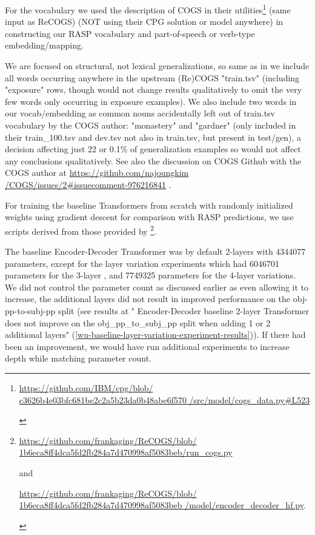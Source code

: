 \documentclass[11pt]{article}
\begin{document}
For the vocabulary we used the \citep{klinger2024compositionalprogramgenerationfewshot} description of COGS in their utilities\footnote{\begin{footnotesize}\href{https://github.com/IBM/cpg/blob/c3626b4e03bfc681be2c2a5b23da0b48abe6f570/src/model/cogs\_data.py\#L523}{https://github.com/IBM/cpg/blob/
c3626b4e03bfc681be2c2a5b23da0b48abe6f570
/src/model/cogs\_data.py\#L523}
\end{footnotesize}
} (same input as ReCOGS) (NOT using their CPG solution or model anywhere) in constructing our RASP vocabulary and part-of-speech or verb-type embedding/mapping. 

We are focused on structural, not lexical generalizations, so same as in \citep{klinger2024compositionalprogramgenerationfewshot} we include all words occurring anywhere in the upstream (Re)COGS "train.tsv" (including "exposure" rows, though would not change results qualitatively to omit the very few words only occurring in exposure examples). We also include two words in our vocab/embedding as common nouns accidentally left out of train.tsv vocabulary by the COGS author: "monastery" and "gardner" (only included in their train\_100.tsv and dev.tsv not also in train.tsv, but present in test/gen), a decision affecting just 22 or 0.1\% of generalization examples so would not affect any conclusions qualitatively. See also the discussion on COGS Github with the COGS author at 
\href{https://github.com/najoungkim/COGS/issues/2\#issuecomment-976216841}{https://github.com/najoungkim
/COGS/issues/2\#issuecomment-976216841} .

For training the baseline Transformers from scratch with randomly initialized weights using gradient descent for comparison with RASP predictions, we use scripts derived from those provided by \citep{Wu2023}\footnote{\begin{footnotesize}\href{https://github.com/frankaging/ReCOGS/blob/1b6eca8ff4dca5fd2fb284a7d470998af5083beb/run\_cogs.py}{https://github.com/frankaging/ReCOGS/blob/
1b6eca8ff4dca5fd2fb284a7d470998af5083beb/run\_cogs.py}

and

\href{https://github.com/frankaging/ReCOGS/blob/1b6eca8ff4dca5fd2fb284a7d470998af5083beb/model/encoder\_decoder\_hf.py}{https://github.com/frankaging/ReCOGS/blob/
1b6eca8ff4dca5fd2fb284a7d470998af5083beb
/model/encoder\_decoder\_hf.py}.
\end{footnotesize}
}.

The baseline \citep{Wu2023} Encoder-Decoder Transformer was by default 2-layers with 4344077 parameters,
except for the layer variation experiments which had 6046701 parameters for the 3-layer , and 7749325 parameters for the 4-layer variations.
We did not control the parameter count as discussed earlier as even allowing it to increase, the additional layers did not result in improved performance on the obj-pp-to-subj-pp split (see results at "\citep{Wu2023} Encoder-Decoder baseline 2-layer Transformer does not improve on the obj\_pp\_to\_subj\_pp split when adding 1 or 2 additional layers" (\ref{wu-baseline-layer-variation-experiment-results})). If there had been an improvement, we would have run additional experiments to increase depth while matching parameter count.
\end{document}
